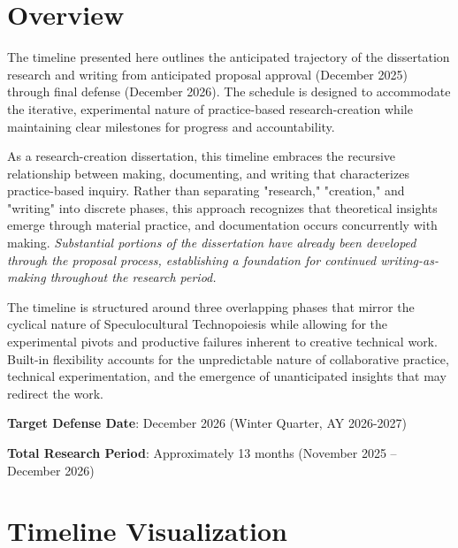 \section{Overview}

The timeline presented here outlines the anticipated trajectory of the dissertation research and writing from anticipated proposal approval (December 2025) through final defense (December 2026). The schedule is designed to accommodate the iterative, experimental nature of practice-based research-creation while maintaining clear milestones for progress and accountability.

As a research-creation dissertation, this timeline embraces the recursive relationship between making, documenting, and writing that characterizes practice-based inquiry. Rather than separating "research," "creation," and "writing" into discrete phases, this approach recognizes that theoretical insights emerge through material practice, and documentation occurs concurrently with making. \textit{Substantial portions of the dissertation have already been developed through the proposal process, establishing a foundation for continued writing-as-making throughout the research period.}

The timeline is structured around three overlapping phases that mirror the cyclical nature of Speculocultural Technopoiesis while allowing for the experimental pivots and productive failures inherent to creative technical work. Built-in flexibility accounts for the unpredictable nature of collaborative practice, technical experimentation, and the emergence of unanticipated insights that may redirect the work.

\textbf{Target Defense Date}: December 2026 (Winter Quarter, AY 2026-2027)

\textbf{Total Research Period}: Approximately 13 months (November 2025 – December 2026)

\section{Timeline Visualization}

